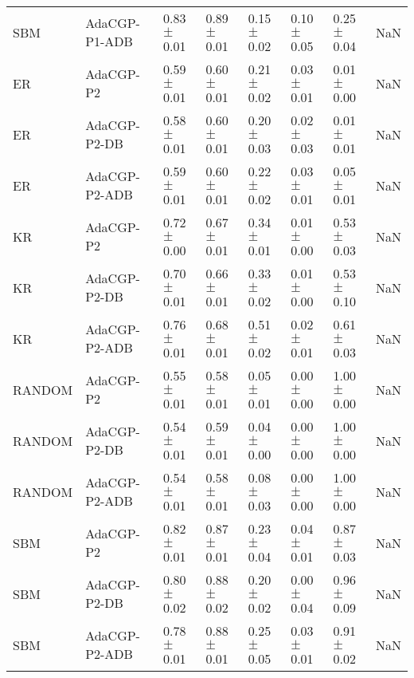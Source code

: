 \begin{tabular}{lllllllr}
SBM & AdaCGP-P1-ADB & 0.83{\scriptsize$\pm$0.01} & 0.89{\scriptsize$\pm$0.01} & 0.15{\scriptsize$\pm$0.02} & 0.10{\scriptsize$\pm$0.05} & 0.25{\scriptsize$\pm$0.04} & NaN \\
ER & AdaCGP-P2 & 0.59{\scriptsize$\pm$0.01} & 0.60{\scriptsize$\pm$0.01} & 0.21{\scriptsize$\pm$0.02} & 0.03{\scriptsize$\pm$0.01} & 0.01{\scriptsize$\pm$0.00} & NaN \\
ER & AdaCGP-P2-DB & 0.58{\scriptsize$\pm$0.01} & 0.60{\scriptsize$\pm$0.01} & 0.20{\scriptsize$\pm$0.03} & 0.02{\scriptsize$\pm$0.03} & 0.01{\scriptsize$\pm$0.01} & NaN \\
ER & AdaCGP-P2-ADB & 0.59{\scriptsize$\pm$0.01} & 0.60{\scriptsize$\pm$0.01} & 0.22{\scriptsize$\pm$0.02} & 0.03{\scriptsize$\pm$0.01} & 0.05{\scriptsize$\pm$0.01} & NaN \\
KR & AdaCGP-P2 & 0.72{\scriptsize$\pm$0.00} & 0.67{\scriptsize$\pm$0.01} & 0.34{\scriptsize$\pm$0.01} & 0.01{\scriptsize$\pm$0.00} & 0.53{\scriptsize$\pm$0.03} & NaN \\
KR & AdaCGP-P2-DB & 0.70{\scriptsize$\pm$0.01} & 0.66{\scriptsize$\pm$0.01} & 0.33{\scriptsize$\pm$0.02} & 0.01{\scriptsize$\pm$0.00} & 0.53{\scriptsize$\pm$0.10} & NaN \\
KR & AdaCGP-P2-ADB & 0.76{\scriptsize$\pm$0.01} & 0.68{\scriptsize$\pm$0.01} & 0.51{\scriptsize$\pm$0.02} & 0.02{\scriptsize$\pm$0.01} & 0.61{\scriptsize$\pm$0.03} & NaN \\
RANDOM & AdaCGP-P2 & 0.55{\scriptsize$\pm$0.01} & 0.58{\scriptsize$\pm$0.01} & 0.05{\scriptsize$\pm$0.01} & 0.00{\scriptsize$\pm$0.00} & 1.00{\scriptsize$\pm$0.00} & NaN \\
RANDOM & AdaCGP-P2-DB & 0.54{\scriptsize$\pm$0.01} & 0.59{\scriptsize$\pm$0.01} & 0.04{\scriptsize$\pm$0.00} & 0.00{\scriptsize$\pm$0.00} & 1.00{\scriptsize$\pm$0.00} & NaN \\
RANDOM & AdaCGP-P2-ADB & 0.54{\scriptsize$\pm$0.01} & 0.58{\scriptsize$\pm$0.01} & 0.08{\scriptsize$\pm$0.03} & 0.00{\scriptsize$\pm$0.00} & 1.00{\scriptsize$\pm$0.00} & NaN \\
SBM & AdaCGP-P2 & 0.82{\scriptsize$\pm$0.01} & 0.87{\scriptsize$\pm$0.01} & 0.23{\scriptsize$\pm$0.04} & 0.04{\scriptsize$\pm$0.01} & 0.87{\scriptsize$\pm$0.03} & NaN \\
SBM & AdaCGP-P2-DB & 0.80{\scriptsize$\pm$0.02} & 0.88{\scriptsize$\pm$0.02} & 0.20{\scriptsize$\pm$0.02} & 0.00{\scriptsize$\pm$0.04} & 0.96{\scriptsize$\pm$0.09} & NaN \\
SBM & AdaCGP-P2-ADB & 0.78{\scriptsize$\pm$0.01} & 0.88{\scriptsize$\pm$0.01} & 0.25{\scriptsize$\pm$0.05} & 0.03{\scriptsize$\pm$0.01} & 0.91{\scriptsize$\pm$0.02} & NaN \\

\end{tabular}

